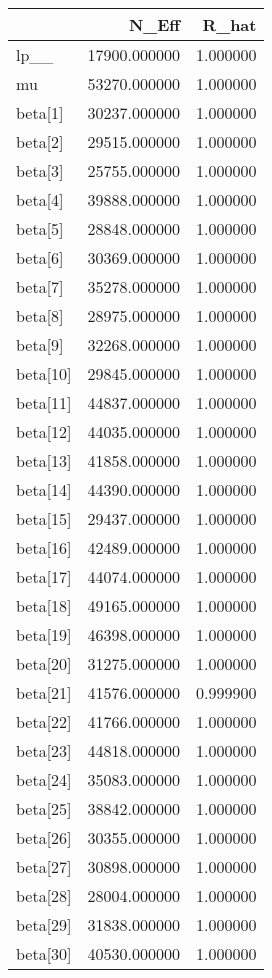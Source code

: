 \begin{tabular}{lrr}
\toprule
 & N\_Eff & R\_hat \\
\midrule
lp\_\_ & 17900.000000 & 1.000000 \\
mu & 53270.000000 & 1.000000 \\
beta[1] & 30237.000000 & 1.000000 \\
beta[2] & 29515.000000 & 1.000000 \\
beta[3] & 25755.000000 & 1.000000 \\
beta[4] & 39888.000000 & 1.000000 \\
beta[5] & 28848.000000 & 1.000000 \\
beta[6] & 30369.000000 & 1.000000 \\
beta[7] & 35278.000000 & 1.000000 \\
beta[8] & 28975.000000 & 1.000000 \\
beta[9] & 32268.000000 & 1.000000 \\
beta[10] & 29845.000000 & 1.000000 \\
beta[11] & 44837.000000 & 1.000000 \\
beta[12] & 44035.000000 & 1.000000 \\
beta[13] & 41858.000000 & 1.000000 \\
beta[14] & 44390.000000 & 1.000000 \\
beta[15] & 29437.000000 & 1.000000 \\
beta[16] & 42489.000000 & 1.000000 \\
beta[17] & 44074.000000 & 1.000000 \\
beta[18] & 49165.000000 & 1.000000 \\
beta[19] & 46398.000000 & 1.000000 \\
beta[20] & 31275.000000 & 1.000000 \\
beta[21] & 41576.000000 & 0.999900 \\
beta[22] & 41766.000000 & 1.000000 \\
beta[23] & 44818.000000 & 1.000000 \\
beta[24] & 35083.000000 & 1.000000 \\
beta[25] & 38842.000000 & 1.000000 \\
beta[26] & 30355.000000 & 1.000000 \\
beta[27] & 30898.000000 & 1.000000 \\
beta[28] & 28004.000000 & 1.000000 \\
beta[29] & 31838.000000 & 1.000000 \\
beta[30] & 40530.000000 & 1.000000 \\

\end{tabular}

